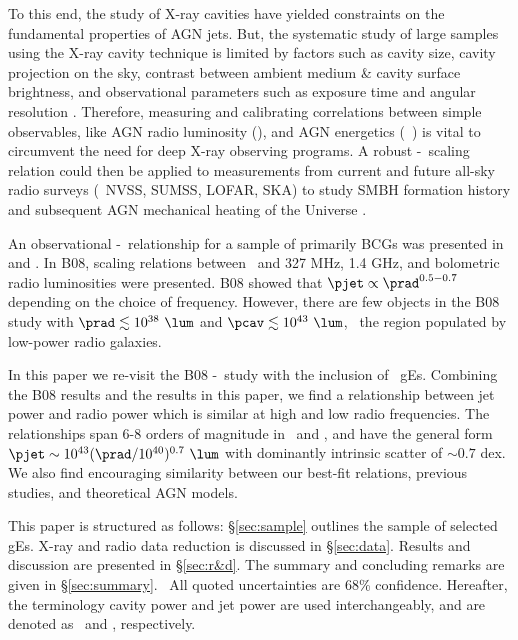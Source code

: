 \documentclass{emulateapj}
\begin{document}
To this end, the study of X-ray cavities have yielded constraints on
the fundamental properties of AGN jets. But, the systematic study of
large samples using the X-ray cavity technique is limited by factors
such as cavity size, cavity projection on the sky, contrast between
ambient medium \& cavity surface brightness, and observational
parameters such as exposure time and angular resolution
\citep{2009arXiv0909.0397B}. Therefore, measuring and calibrating
correlations between simple observables, like AGN radio luminosity
(\prad), and AGN energetics (\eg\ \pjet) is vital to circumvent the
need for deep X-ray observing programs. A robust \pjet-\prad\ scaling
relation could then be applied to measurements from current and future
all-sky radio surveys (\eg\ NVSS, SUMSS, LOFAR, SKA) to study SMBH
formation history and subsequent AGN mechanical heating of the
Universe 	\citep{croton06, 2006MNRAS.366..397S}.

An observational \pjet-\prad\ relationship for a sample of primarily
BCGs was presented in \citet[][hereafter B04]{birzan04} and
\citet[][hereafter B08]{birzan08}. In B08, scaling relations between
\pjet\ and 327 MHz, 1.4 GHz, and bolometric radio luminosities were
presented. B08 showed that $\pjet \propto \prad^{0.5-0.7}$ depending
on the choice of frequency. However, there are few objects in the B08
study with $\prad \lesssim 10^{38} ~\lum$ and $\pcav \lesssim 10^{43}
~\lum$, \ie\ the region populated by low-power radio galaxies.

In this paper we re-visit the B08 \pjet-\prad\ study with the
inclusion of \samp\ gEs. Combining the B08 results and the results in
this paper, we find a relationship between jet power and radio power
which is similar at high and low radio frequencies. The relationships
span 6-8 orders of magnitude in \pjet\ and \prad, and have the general
form $\pjet \sim 10^{43} (\prad/10^{40})^{0.7} ~\lum$ with dominantly
intrinsic scatter of $\sim 0.7$ dex. We also find encouraging
similarity between our best-fit relations, previous studies, and
theoretical AGN models.

This paper is structured as follows: \S\ref{sec:sample} outlines the
sample of selected gEs. X-ray and radio data reduction is discussed in
\S\ref{sec:data}. Results and discussion are presented in
\S\ref{sec:r&d}. The summary and concluding remarks are given in
\S\ref{sec:summary}. \LCDM\ All quoted uncertainties are 68\%
confidence. Hereafter, the terminology cavity power and jet power are
used interchangeably, and are denoted as \pcav\ and \pjet,
respectively.
\end{document}
